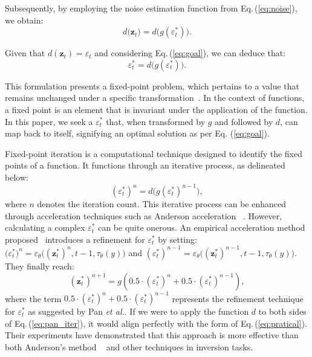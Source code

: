 \documentclass[letterpaper]{article} \usepackage{aaai25}  \usepackage{times}  \usepackage{helvet}  \usepackage{courier}  \usepackage[hyphens]{url}  \usepackage{graphicx} \urlstyle{rm} \def\UrlFont{\rm}  \usepackage{natbib}  \usepackage{caption} \frenchspacing  \setlength{\pdfpagewidth}{8.5in} \setlength{\pdfpageheight}{11in} \usepackage{algorithm}
\begin{document}
Subsequently, by employing the noise estimation function from Eq.\,(\ref{eq:noise}), we obtain:
\begin{equation}\label{eq:two_functions}
d\big(\mathbf{z}_t) = d\big(g(\varepsilon_t^*)\big).
\end{equation}


Given that $d(\mathbf{z}_t)  = \varepsilon_{t}$ and considering Eq.\,(\ref{eq:goal}), we can deduce that:
\begin{equation}
    \varepsilon_{t}^* = d\big(g(\varepsilon_t^*)\big).
\end{equation}



This formulation presents a fixed-point problem, which pertains to a value that remains unchanged under a specific transformation~\cite{bauschke2011fixed}.  In the context of functions, a fixed point is an element that is invariant under the application of the function. In this paper, we seek a $\varepsilon^*_t$ that, when transformed by $g$ and followed by $d$, can map back to itself, signifying an optimal solution as per Eq. (\ref{eq:goal}).


Fixed-point iteration is a computational technique designed to identify the fixed points of a function. It functions through an iterative process, as delineated below:
\begin{equation}\label{eq:pratical}
(\varepsilon^*_{t})^n = d\big(g(\varepsilon^*_{t})^{n-1}\big),
\end{equation}
where $n$ denotes the iteration count. This iterative process can be enhanced through acceleration techniques such as Anderson acceleration ~\cite{anderson1965iterative}.
However, calculating a complex $\varepsilon^*_{t}$ can be quite onerous. An empirical acceleration method proposed~\cite{pan2023effective} introduces a refinement for $\varepsilon_t^*$ by setting: $\big(\varepsilon^*_{t})^n = \varepsilon_{\theta}(({\mathbf{z}^{*}_{t}})^{n},t-1,\tau_{\theta}(y)\big)$ and $(\varepsilon^*_{t})^{n-1} = \varepsilon_{\theta}\big(({\mathbf{z}^{*}_{t}})^{n-1},t-1,\tau_{\theta}(y)\big)$. They finally reach:
\begin{equation}\label{eq:pan_iter}
({\mathbf{z}^{*}_{t}})^{n+1} = g(0.5 \cdot (\varepsilon^*_{t})^n+0.5 \cdot (\varepsilon^*_{t})^{n-1}),
\end{equation}
where the term $0.5 \cdot (\varepsilon^*_{t})^n+0.5 \cdot (\varepsilon^*_{t})^{n-1}$ represents the refinement technique for $\varepsilon^*_{t}$ as suggested by Pan \emph{et al.}. If we were to apply the function $d$ to both sides of Eq.\,(\ref{eq:pan_iter}), it would align perfectly with the form of Eq.\,(\ref{eq:pratical}). Their experiments have demonstrated that this approach is more effective than both Anderson's method ~\cite{anderson1965iterative} and other techniques in inversion tasks.
\end{document}
